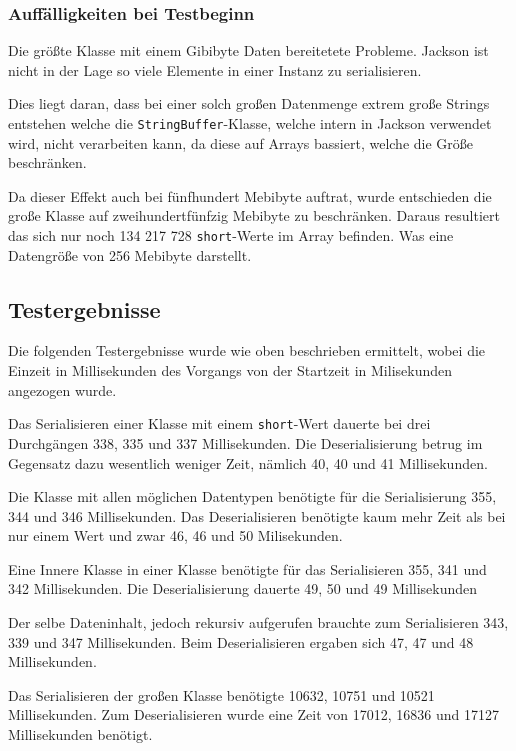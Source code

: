\subsubsection{Auff\"alligkeiten bei Testbeginn}
Die gr\"o\ss{}te Klasse mit einem Gibibyte Daten bereitetete Probleme. 
Jackson ist nicht in der Lage so viele Elemente in einer Instanz zu serialisieren.

Dies liegt daran, dass bei einer solch gro\ss{}en Datenmenge extrem gro\ss{}e Strings entstehen welche die \texttt{StringBuffer}-Klasse, welche intern in Jackson verwendet wird, nicht verarbeiten kann, da diese auf Arrays bassiert, welche die Gr\"o\ss{}e beschr\"anken.

Da dieser Effekt auch bei f\"unfhundert Mebibyte auftrat, wurde entschieden die gro\ss{}e Klasse auf zweihundertf\"unfzig Mebibyte zu beschr\"anken. Daraus resultiert das sich nur noch 134 217 728 \texttt{short}-Werte im Array befinden. Was eine Datengr\"o\ss{}e von 256 Mebibyte darstellt.

\subsection{Testergebnisse}
Die folgenden Testergebnisse wurde wie oben beschrieben ermittelt, wobei die Einzeit in Millisekunden des Vorgangs von der Startzeit in Milisekunden angezogen wurde.

Das Serialisieren einer Klasse mit einem \texttt{short}-Wert dauerte bei drei Durchg\"angen 338, 335 und 337 Millisekunden. Die Deserialisierung betrug im Gegensatz dazu wesentlich weniger Zeit, n\"amlich 40, 40 und 41 Millisekunden. 

Die Klasse mit allen m\"oglichen Datentypen ben\"otigte f\"ur die Serialisierung  355, 344 und 346 Millisekunden. Das Deserialisieren ben\"otigte kaum mehr Zeit als bei nur einem Wert und zwar 46, 46 und 50 Milisekunden.

Eine Innere Klasse in einer Klasse ben\"otigte f\"ur das Serialisieren 355, 341 und 342 Millisekunden. Die Deserialisierung dauerte 49, 50 und 49 Millisekunden

Der selbe Dateninhalt, jedoch rekursiv aufgerufen brauchte zum Serialisieren 343, 339 und 347 Millisekunden. Beim Deserialisieren ergaben sich 47, 47 und 48 Millisekunden.

Das Serialisieren der gro\ss{}en Klasse ben\"otigte 10632, 10751 und 10521 Millisekunden. Zum Deserialisieren wurde eine Zeit von 17012, 16836 und 17127 Millisekunden ben\"otigt.

